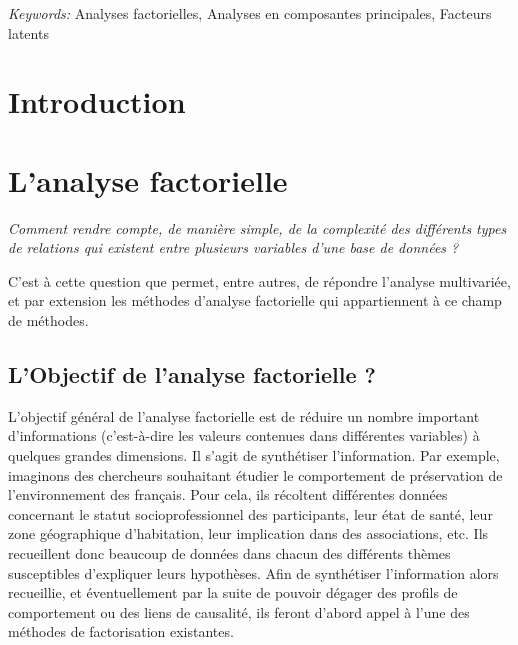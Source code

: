 \documentclass[
  french,
  11pt,
  a4paper,
]{article}
\renewcommand*\contentsname{Table des matières}
\newcommand\contentsname{Table des matières}
\begin{document}
\noindent%
{\it Keywords:} Analyses factorielles, Analyses en composantes
principales, Facteurs latents
\vfill


\renewcommand*\contentsname{Table des matières}
{
\setcounter{tocdepth}{3}
\tableofcontents
}
\listoffigures
\listoftables

\section*{Introduction}\label{introduction}

\section{L'analyse factorielle}\label{lanalyse-factorielle}

\emph{Comment rendre compte, de manière simple, de la complexité des
différents types de relations qui existent entre plusieurs variables
d'une base de données ?}

C'est à cette question que permet, entre autres, de répondre l'analyse
multivariée, et par extension les méthodes d'analyse factorielle qui
appartiennent à ce champ de méthodes.

\subsection{L'Objectif de l'analyse factorielle
?}\label{lobjectif-de-lanalyse-factorielle}

L'objectif général de l'analyse factorielle est de réduire un nombre
important d'informations (c'est-à-dire les valeurs contenues dans
différentes variables) à quelques grandes dimensions. Il s'agit de
synthétiser l'information. Par exemple, imaginons des chercheurs
souhaitant étudier le comportement de préservation de l'environnement
des français. Pour cela, ils récoltent différentes données concernant le
statut socioprofessionnel des participants, leur état de santé, leur
zone géographique d'habitation, leur implication dans des associations,
etc. Ils recueillent donc beaucoup de données dans chacun des différents
thèmes susceptibles d'expliquer leurs hypothèses. Afin de synthétiser
l'information alors recueillie, et éventuellement par la suite de
pouvoir dégager des profils de comportement ou des liens de causalité,
ils feront d'abord appel à l'une des méthodes de factorisation
existantes.
\end{document}
